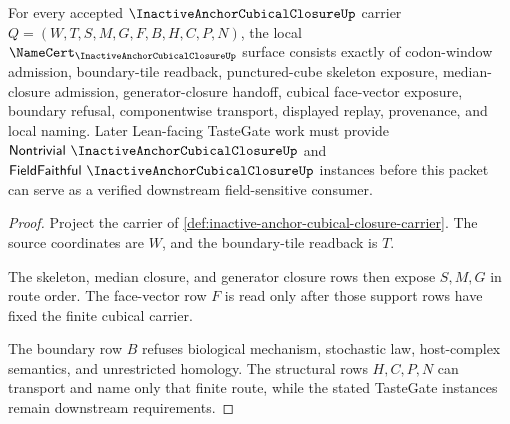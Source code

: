 \begin{theorem}
\label{thm:inactive-anchor-cubical-closure-namecert-obligations}
For every accepted $\InactiveAnchorCubicalClosureUp$ carrier $Q=(W,T,S,M,G,F,B,H,C,P,N)$, the local $\NameCert_{\InactiveAnchorCubicalClosureUp}$ surface consists exactly of codon-window admission, boundary-tile readback, punctured-cube skeleton exposure, median-closure admission, generator-closure handoff, cubical face-vector exposure, boundary refusal, componentwise transport, displayed replay, provenance, and local naming. Later Lean-facing TasteGate work must provide $\mathsf{Nontrivial}\ \InactiveAnchorCubicalClosureUp$ and $\mathsf{FieldFaithful}\ \InactiveAnchorCubicalClosureUp$ instances before this packet can serve as a verified downstream field-sensitive consumer.
\end{theorem}
\begin{proof}
Project the carrier of \autoref{def:inactive-anchor-cubical-closure-carrier}. The source coordinates are $W$, and the boundary-tile readback is $T$.

The skeleton, median closure, and generator closure rows then expose $S,M,G$ in route order. The face-vector row $F$ is read only after those support rows have fixed the finite cubical carrier.

The boundary row $B$ refuses biological mechanism, stochastic law, host-complex semantics, and unrestricted homology. The structural rows $H,C,P,N$ can transport and name only that finite route, while the stated TasteGate instances remain downstream requirements.
\end{proof}

